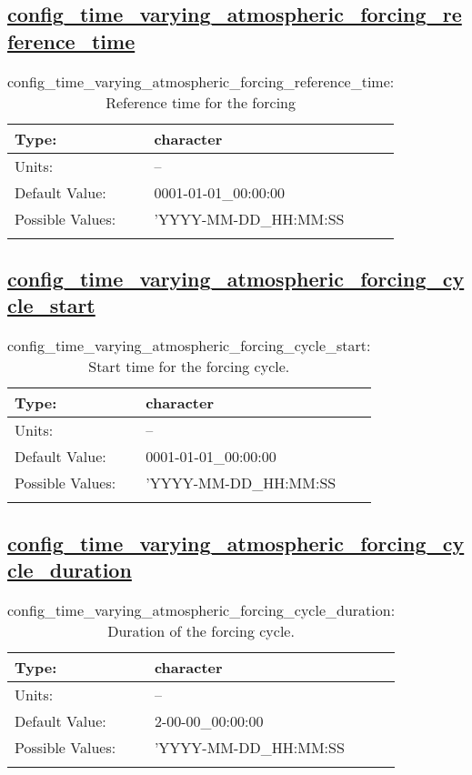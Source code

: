 \subsection[config\_time\_varying\_atmospheric\_forcing\_reference\_time]{\hyperref[sec:nm_tab_time_varying_forcing]{config\_time\_varying\_atmospheric\_forcing\_reference\_time}}
\label{subsec:nm_sec_config_time_varying_atmospheric_forcing_reference_time}
\begin{center}
\begin{longtable}{| p{2.0in} || p{4.0in} |}
    \hline
    Type: & character \\
    \hline
    Units: & -- \\
    \hline
    Default Value: & 0001-01-01\_00:00:00 \\
    \hline
    Possible Values: & 'YYYY-MM-DD\_HH:MM:SS \\
    \hline
    \caption{config\_time\_varying\_atmospheric\_forcing\_reference\_time: Reference time for the forcing}
\end{longtable}
\end{center}
\subsection[config\_time\_varying\_atmospheric\_forcing\_cycle\_start]{\hyperref[sec:nm_tab_time_varying_forcing]{config\_time\_varying\_atmospheric\_forcing\_cycle\_start}}
\label{subsec:nm_sec_config_time_varying_atmospheric_forcing_cycle_start}
\begin{center}
\begin{longtable}{| p{2.0in} || p{4.0in} |}
    \hline
    Type: & character \\
    \hline
    Units: & -- \\
    \hline
    Default Value: & 0001-01-01\_00:00:00 \\
    \hline
    Possible Values: & 'YYYY-MM-DD\_HH:MM:SS \\
    \hline
    \caption{config\_time\_varying\_atmospheric\_forcing\_cycle\_start: Start time for the forcing cycle.}
\end{longtable}
\end{center}
\subsection[config\_time\_varying\_atmospheric\_forcing\_cycle\_duration]{\hyperref[sec:nm_tab_time_varying_forcing]{config\_time\_varying\_atmospheric\_forcing\_cycle\_duration}}
\label{subsec:nm_sec_config_time_varying_atmospheric_forcing_cycle_duration}
\begin{center}
\begin{longtable}{| p{2.0in} || p{4.0in} |}
    \hline
    Type: & character \\
    \hline
    Units: & -- \\
    \hline
    Default Value: & 2-00-00\_00:00:00 \\
    \hline
    Possible Values: & 'YYYY-MM-DD\_HH:MM:SS \\
    \hline
    \caption{config\_time\_varying\_atmospheric\_forcing\_cycle\_duration: Duration of the forcing cycle.}
\end{longtable}
\end{center}
